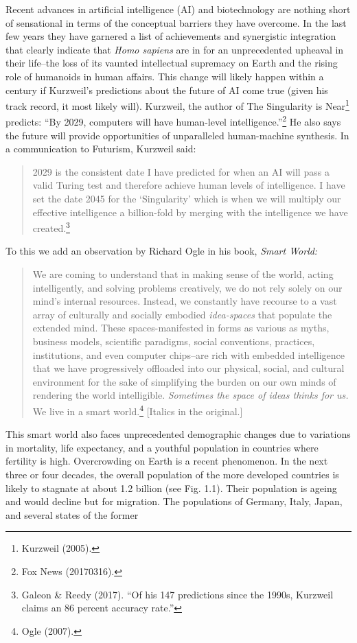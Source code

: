 \begin{multicols}{2}
Recent advances in artificial intelligence (AI) and biotechnology are nothing short of sensational in
terms of the conceptual barriers they have overcome. In the last few years they have garnered a list
of achievements and synergistic integration that clearly indicate that \textit{Homo sapiens} are in for an
unprecedented upheaval in their life--the loss of its vaunted intellectual supremacy on Earth and the
rising role of humanoids in human affairs. This change will likely happen within a century if Kurzweil's
predictions about the future of AI come true (given his track record, it most likely will). Kurzweil, the
author of The Singularity is Near\footnote{Kurzweil (2005).} predicts: “By 2029, computers will have human-level intelligence.”\footnote{Fox News (20170316).}
He also says the future will provide opportunities of unparalleled human-machine synthesis. In a
communication to Futurism, Kurzweil said:
\begin{quote}
2029 is the consistent date I have predicted for when an AI will pass a valid Turing test and therefore
achieve human levels of intelligence. I have set the date 2045 for the `Singularity' which is when we
will multiply our effective intelligence a billion-fold by merging with the intelligence we have
created.\footnote{Galeon \& Reedy (2017). “Of his 147 predictions since the 1990s, Kurzweil claims an 86 percent accuracy rate.”}
\end{quote}

To this we add an observation by Richard Ogle in his book, \textit{Smart World:}
\begin{quote}
We are coming to understand that in making sense of the world, acting intelligently, and solving
problems creatively, we do not rely solely on our mind's internal resources. Instead, we constantly
have recourse to a vast array of culturally and socially embodied \textit{idea-spaces} that populate the
extended mind. These spaces-manifested in forms as various as myths, business models, scientific
paradigms, social conventions, practices, institutions, and even computer chips--are rich with
embedded intelligence that we have progressively offloaded into our physical, social, and cultural
environment for the sake of simplifying the burden on our own minds of rendering the world
intelligible. \textit{Sometimes the space of ideas thinks for us.} We live in a smart world.\footnote{Ogle (2007).} [Italics in the original.]
\end{quote}

This smart world also faces unprecedented demographic changes due to variations in mortality, life
expectancy, and a youthful population in countries where fertility is high. Overcrowding on Earth is a
recent phenomenon. In the next three or four decades, the overall population of the more developed
countries is likely to stagnate at about 1.2 billion (see Fig. 1.1). Their population is ageing and would
decline but for migration. The populations of Germany, Italy, Japan, and several states of the former


\end{multicols}
